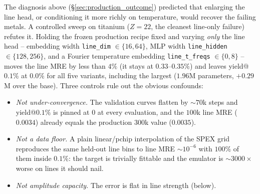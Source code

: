 \documentclass[11pt,a4paper]{article}
\newcommand{\code}[1]{\texttt{#1}}
\begin{document}
The diagnosis above (\S\ref{sec:production_outcome}) predicted that enlarging the
line head, or conditioning it more richly on temperature, would recover the
failing metals. A controlled sweep on titanium ($Z=22$, the cleanest line-only
failure) refutes it. Holding the frozen production recipe fixed and varying
\emph{only} the line head -- embedding width \code{line\_dim} $\in\{16,64\}$, MLP
width \code{line\_hidden} $\in\{128,256\}$, and a Fourier temperature embedding
\code{line\_t\_freqs} $\in\{0,8\}$ -- moves the line MRE by less than $4\%$ (it
stays at $0.33$--$0.35\%$) and leaves yield@$0.1\%$ at $0.0\%$ for all five
variants, including the largest ($1.96$M parameters, $+0.29$M over the base).
Three controls rule out the obvious confounds:
\begin{itemize}
\item \emph{Not under-convergence.} The validation curves flatten by
$\sim$$70$k steps and yield@$0.1\%$ is pinned at $0$ at every evaluation, and the
$100$k line MRE ($0.0034$) already equals the production $300$k value
($0.0035$).
\item \emph{Not a data floor.} A plain linear/pchip interpolation of the SPEX
grid reproduces the same held-out line bins to line MRE $\sim$$10^{-6}$ with
$100\%$ of them inside $0.1\%$: the target is trivially fittable and the emulator
is $\sim$$3000\times$ worse on lines it should nail.
\item \emph{Not amplitude capacity.} The error is flat in line strength (below).
\end{itemize}
\end{document}
